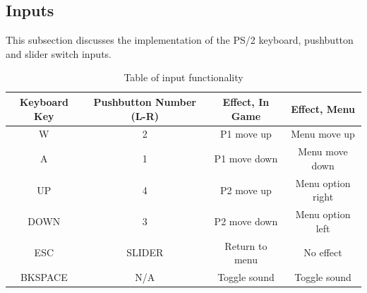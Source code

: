 \documentclass[a4paper,12pt]{article}
\begin{document}
\subsection{Inputs}
\begin{flushleft}
This subsection discusses the implementation of the PS/2 keyboard, pushbutton and slider switch inputs.

\begin{table}[H]
	\caption{Table of input functionality}
	\begin{center}
	\begin{tabular}{|c|c|c|c|}
		\hline 
		\textbf{Keyboard Key} & \textbf{Pushbutton Number (L-R)} & \textbf{Effect, In Game} & \textbf{Effect, Menu} \\ 
		\hline 
		W & 2 & P1 move up & Menu move up \\ 
		\hline 
		A & 1 & P1 move down & Menu move down \\ 
		\hline 
		UP & 4 & P2 move up & Menu option right \\ 
		\hline 
		DOWN & 3 & P2 move down & Menu option left \\ 
		\hline 
		ESC & SLIDER & Return to menu & No effect \\ 
		\hline 
		BKSPACE & N/A & Toggle sound & Toggle sound \\ 
		\hline 
	\end{tabular}
	\end{center}
\end{table}


\end{flushleft}
\end{document}
